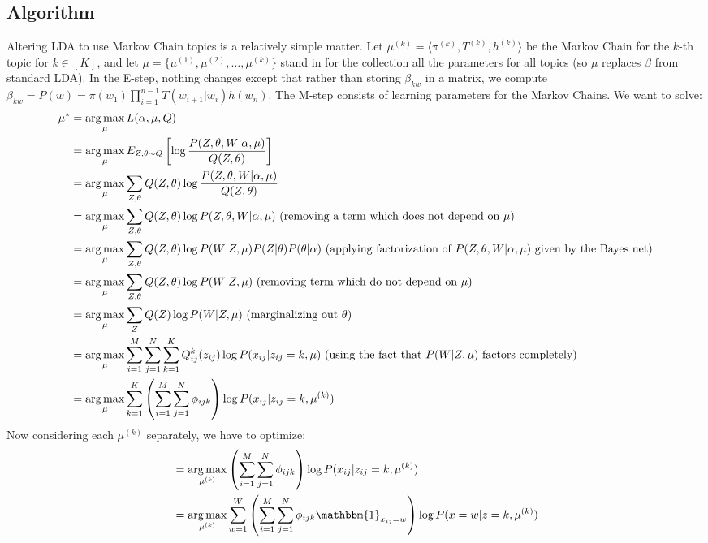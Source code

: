\documentclass[10pt]{article}
\begin{document}
\subsection{Algorithm}
Altering LDA to use Markov Chain topics is a relatively simple matter. Let $\mu^{(k)} =  \langle \pi^{(k)}, T^{(k)}, h^{(k)} \rangle$ be the Markov Chain for the $k$-th topic for $k \in [K]$, and let $\mu = \{\mu^{(1)}, \mu^{(2)}, \dots, \mu^{(k)}\}$ stand in for the collection all the parameters for all topics (so $\mu$ replaces $\beta$ from standard LDA). In the E-step, nothing changes except that rather than storing $\beta_{kw}$ in a matrix, we compute $\beta_{kw} = P(w) = \pi(w_1) \prod_{i=1}^{n-1} T(w_{i+1}| w_i) h(w_n)$. The M-step consists of learning parameters for the Markov Chains. We want to solve:
\begin{align}
    \mu^*
    &= \operatorname*{arg\,max}_{\mu} L(\alpha, \mu, Q)\\
    &= \operatorname*{arg\,max}_{\mu} E_{Z, \theta \sim Q}\left[\log \frac{P(Z, \theta, W | \alpha, \mu)}{Q(Z, \theta)}\right]\\
    &= \operatorname*{arg\,max}_{\mu} \sum_{Z, \theta}Q(Z, \theta) \log \frac{P(Z, \theta, W | \alpha, \mu)}{Q(Z, \theta)}\\
    &= \operatorname*{arg\,max}_{\mu} \sum_{Z, \theta}Q(Z, \theta) \log P(Z, \theta, W | \alpha, \mu)~\text{(removing a term which does not depend on $\mu$)}\\
    &= \operatorname*{arg\,max}_{\mu} \sum_{Z, \theta}Q(Z, \theta) \log P(W | Z, \mu) P(Z | \theta) P(\theta | \alpha)~\text{(applying factorization of $P(Z, \theta, W | \alpha, \mu)$ given by the Bayes net)}\\
    &= \operatorname*{arg\,max}_{\mu} \sum_{Z, \theta}Q(Z, \theta) \log P(W | Z, \mu)~\text{(removing term which do not depend on $\mu$)}\\
    &= \operatorname*{arg\,max}_{\mu} \sum_{Z}Q(Z) \log P(W | Z, \mu)~\text{(marginalizing out $\theta$)}\\
    &= \operatorname*{arg\,max}_{\mu} \sum_{i=1}^M \sum_{j=1}^N \sum_{k=1}^K Q^k_{ij}(z_{ij}) \log P(x_{ij} | z_{ij} = k, \mu)~\text{(using the fact that $P(W | Z, \mu)$ factors completely)}\\
    &= \operatorname*{arg\,max}_{\mu} \sum_{k=1}^K \left(\sum_{i=1}^M \sum_{j=1}^N \phi_{ijk}\right) \log P(x_{ij} | z_{ij} = k, \mu^{(k)})
\end{align}
Now considering each $\mu^{(k)}$ separately, we have to optimize:
\begin{align}
    &= \argmax_{\mu^{(k)}} \left(\sum_{i=1}^M \sum_{j=1}^N \phi_{ijk}\right) \log P(x_{ij} | z_{ij} = k, \mu^{(k)})\\
    &= \argmax_{\mu^{(k)}} \sum_{w=1}^W \left(\sum_{i=1}^M \sum_{j=1}^N \phi_{ijk} \mathbbm{1}_{x_{ij} = w}\right) \log P(x = w | z = k, \mu^{(k)})
\end{align}
\end{document}
